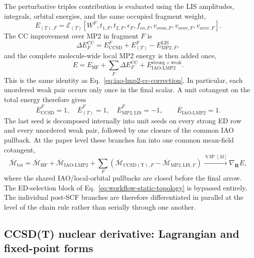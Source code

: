 \documentclass[11pt]{article}
\begin{document}
The perturbative triples contribution is evaluated using the LIS amplitudes,
integrals, orbital energies, and the same occupied fragment weight,
\begin{equation}
 E_{(T),F}=\mathcal E_{(T)}\!\left[
 W^F,t_{1,F},t_{2,F},\epsilon_F,f_{vo,F},
 v_{ovoo,F},v_{ovov,F},v_{ovvv,F}\right].
 \label{eq:lis-weighted-triples-functional}
\end{equation}
The CC improvement over MP2 in fragment $F$ is
\begin{equation}
 \Delta E_F^{\mathrm{CC}}
 =E_{\mathrm{CCSD}}^F+E_{(T)}^F
  -E_{\mathrm{MP2},F}^{\mathrm{LIS}},
 \label{eq:workflow-final-fragment-energy}
\end{equation}
and the complete molecule-wide local MP2 energy is then added once,
\begin{equation}
 E=E_{\mathrm{HF}}+\sum_F\Delta E_F^{\mathrm{CC}}
   +E_{\mathrm{IAO\mbox{-}LMP2}}^{\mathrm{strong+weak}}.
 \label{eq:workflow-total-energy}
\end{equation}
This is the same identity as Eq.~\eqref{eq:iao-lmp2-cc-correction}.  In
particular, each unordered weak pair occurs only once in the final scalar.  A
unit cotangent on the total energy therefore gives
\begin{equation}
 \overline E_{\mathrm{CCSD}}^F=1,
 \quad
 \overline E_{(T)}^F=1,
 \quad
 \overline E_{\mathrm{MP2,LIS}}^F=-1,
 \qquad
 \overline E_{\mathrm{IAO\mbox{-}LMP2}}=1.
 \label{eq:workflow-reverse-seeds}
\end{equation}
The last seed is decomposed internally into unit seeds on every strong ED row
and every unordered weak pair, followed by one closure of the common IAO
pullback.
At the paper level these branches fan into one common mean-field cotangent,
\begin{equation}
 \overline{\mathcal M}_{\mathrm{tot}}
 =\overline{\mathcal M}_{\mathrm{HF}}
  +\overline{\mathcal M}_{\mathrm{IAO\mbox{-}LMP2}}
  +\sum_F\left(
    \overline{\mathcal M}_{\mathrm{CCSD(T)},F}
    -\overline{\mathcal M}_{\mathrm{MP2,LIS},F}
  \right)
 \xrightarrow{\operatorname{VJP}[M]}
 \nabla_{\mathbf R}E,
 \label{eq:workflow-reverse-chain}
\end{equation}
where the shared IAO/local-orbital pullbacks are closed before the final arrow.
The ED-selection block of Eq.~\eqref{eq:workflow-static-topology} is bypassed
entirely.  The individual post-SCF branches are therefore differentiated in
parallel at the level of the chain rule rather than serially through one
another.

\subsection{CCSD(T) nuclear derivative: Lagrangian and fixed-point forms}
\label{sec:iao-dlno-cc-gradient}
\end{document}
